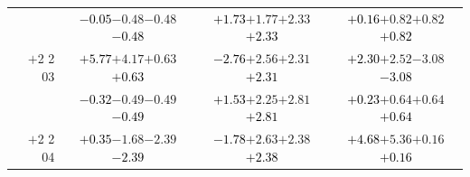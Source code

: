 \documentclass[compress]{beamer}
\begin{document}
\begin{frame}
\begin{tabular}{r | c | c | c}
          & \textcolor{black}{$-0.05$}\hspace{0.1 cm}$-0.48$\hspace{0.1 cm}$-0.48$\hspace{0.1 cm}\textcolor{black}{$-0.48$} & \textcolor{black}{$+1.73$}\hspace{0.1 cm}$+1.77$\hspace{0.1 cm}$+2.33$\hspace{0.1 cm}\textcolor{black}{$+2.33$} & \textcolor{black}{$+0.16$}\hspace{0.1 cm}$+0.82$\hspace{0.1 cm}$+0.82$\hspace{0.1 cm}\textcolor{black}{$+0.82$} \\
$+$2 2 03 & \textcolor{black}{$+5.77$}\hspace{0.1 cm}$+4.17$\hspace{0.1 cm}$+0.63$\hspace{0.1 cm}\textcolor{black}{$+0.63$} & \textcolor{black}{$-2.76$}\hspace{0.1 cm}$+2.56$\hspace{0.1 cm}$+2.31$\hspace{0.1 cm}\textcolor{black}{$+2.31$} & \textcolor{black}{$+2.30$}\hspace{0.1 cm}$+2.52$\hspace{0.1 cm}$-3.08$\hspace{0.1 cm}\textcolor{black}{$-3.08$} \\
          & \textcolor{black}{$-0.32$}\hspace{0.1 cm}$-0.49$\hspace{0.1 cm}$-0.49$\hspace{0.1 cm}\textcolor{black}{$-0.49$} & \textcolor{black}{$+1.53$}\hspace{0.1 cm}$+2.25$\hspace{0.1 cm}$+2.81$\hspace{0.1 cm}\textcolor{black}{$+2.81$} & \textcolor{black}{$+0.23$}\hspace{0.1 cm}$+0.64$\hspace{0.1 cm}$+0.64$\hspace{0.1 cm}\textcolor{black}{$+0.64$} \\
$+$2 2 04 & \textcolor{black}{$+0.35$}\hspace{0.1 cm}$-1.68$\hspace{0.1 cm}$-2.39$\hspace{0.1 cm}\textcolor{black}{$-2.39$} & \textcolor{black}{$-1.78$}\hspace{0.1 cm}$+2.63$\hspace{0.1 cm}$+2.38$\hspace{0.1 cm}\textcolor{black}{$+2.38$} & \textcolor{black}{$+4.68$}\hspace{0.1 cm}$+5.36$\hspace{0.1 cm}$+0.16$\hspace{0.1 cm}\textcolor{black}{$+0.16$} \\

\end{tabular}
\end{frame}
\end{document}
